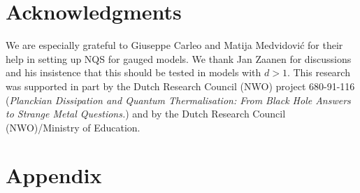 	\section*{Acknowledgments}

	We are especially grateful to Giuseppe Carleo and Matija Medvidovi\' c for their help in setting up NQS for gauged models.
	We thank Jan Zaanen for discussions and his insistence that this should be tested in models with $d>1$.
	This research was supported 
	in part by the Dutch Research Council
	(NWO) project 680-91-116 ({\em Planckian Dissipation and Quantum Thermalisation: From
		Black Hole Answers to Strange Metal Questions.}) and
	by the Dutch Research
	Council (NWO)/Ministry of Education.
	
	\section{Appendix}
